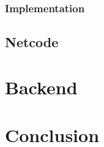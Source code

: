 \documentclass[12pt]{amsart}
\begin{document}
    \subsubsection{Implementation}
      \begin{flushleft}
      \end{flushleft}
  \subsection{Netcode}
    \begin{flushleft}
    \end{flushleft}
\section{Backend}
\section{Conclusion}
\end{document}
